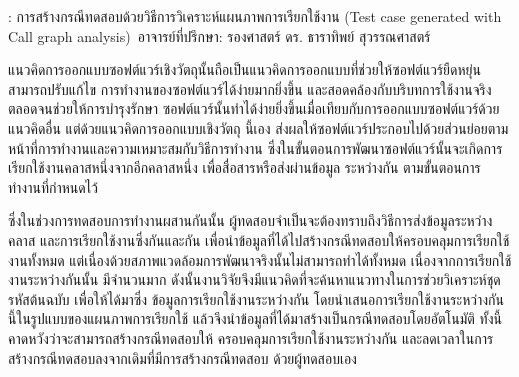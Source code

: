 
\begin{abstractquote}
\studentname : การสร้างกรณีทดสอบด้วยวิธีการวิเคราะห์แผนภาพการเรียกใช้งาน
(Test case generated with Call graph analysis)
\,อาจารย์ที่ปรึกษา: รองศาสตร์ ดร. ธาราทิพย์ สุวรรณศาสตร์
\end{abstractquote}

แนวคิดการออกแบบซอฟต์แวร์เชิงวัตถุนั้นถือเป็นแนวคิดการออกแบบที่ช่วยให้ซอฟต์แวร์ยืดหยุ่น สามารถปรับแก้ไข
การทำงานของซอฟต์แวร์ได้ง่ายมากยิ่งขึ้น และสอดคล้องกับบริบทการใช้งานจริง ตลอดจนช่วยให้การบำรุงรักษา
ซอฟต์แวร์นั้นทำได้ง่ายยิ่งขึ้นเมื่อเทียบกับการออกแบบซอฟต์แวร์ด้วยแนวคิดอื่น แต่ด้วยแนวคิดการออกแบบเชิงวัตถุ
นี้เอง ส่งผลให้ซอฟต์แวร์ประกอบไปด้วยส่วนย่อยตามหน้าที่การทำงานและความเหมาะสมกับวิธีการทำงาน
ซึ่งในขั้นตอนการพัฒนาซอฟต์แวร์นั้นจะเกิดการเรียกใช้งานคลาสหนึ่งจากอีกคลาสหนึ่ง เพื่อสื่อสารหรือส่งผ่านข้อมูล
ระหว่างกัน ตามขั้นตอนการทำงานที่กำหนดไว้

ซึ่งในช่วงการทดสอบการทำงานผสานกันนั้น ผู้ทดสอบจำเป็นจะต้องทราบถึงวิธีการส่งข้อมูลระหว่างคลาส
และการเรียกใช้งานซึ่งกันและกัน เพื่อนำข้อมูลที่ได้ไปสร้างกรณีทดสอบให้ครอบคลุมการเรียกใช้งานทั้งหมด
แต่เนื่องด้วยสภาพแวดล้อมการพัฒนาจริงนั้นไม่สามารถทำได้ทั้งหมด เนื่องจากการเรียกใช้งานระหว่างกันนั้น
มีจำนวนมาก ดังนั้นงานวิจัยจึงมีแนวคิดที่จะค้นหาแนวทางในการช่วยวิเคราะห์ชุดรหัสต้นฉบับ เพื่อให้ได้มาซึ่ง
ข้อมูลการเรียกใช้งานระหว่างกัน โดยนำเสนอการเรียกใช้งานระหว่างกันนี้ในรูปแบบของแผนภาพการเรียกใช้
แล้วจึงนำข้อมูลที่ได้มาสร้างเป็นกรณีทดสอบโดยอัตโนมัติ ทั้งนี้คาดหวังว่าจะสามารถสร้างกรณีทดสอบให้
ครอบคลุมการเรียกใช้งานระหว่างกัน และลดเวลาในการสร้างกรณีทดสอบลงจากเดิมที่มีการสร้างกรณีทดสอบ
ด้วยผู้ทดสอบเอง
